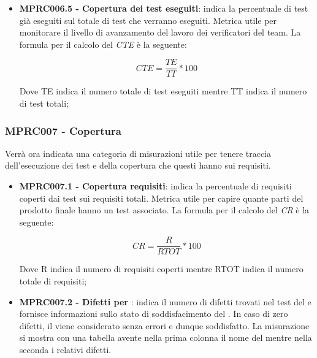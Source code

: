 {\begin{itemize}
    \begin{center}
        \begin{displaymath}
            CD = \frac{DT}{DTU} * 100
        \end{displaymath}
    \end{center}
    Dove DT indica il numero totale di difetti trovati nella fase di test mentre DTU indica la somma dei difetti trovati nei test e quelli trovati durante l'uso del ;
    \item \textbf{MPRC006.5 - Copertura dei test eseguiti}: indica la percentuale di test già eseguiti sul totale di test che verranno eseguiti. Metrica utile per monitorare il livello di avanzamento del lavoro dei verificatori del team. La formula per il calcolo del \textit{CTE} è la seguente:
    \begin{center}
        \begin{displaymath}
            CTE = \frac{TE}{TT} * 100
        \end{displaymath}
    \end{center}
    Dove TE indica il numero totale di test eseguiti mentre TT indica il numero di test totali;
\end{itemize}
\subsubsection{MPRC007 - Copertura}
Verrà ora indicata una categoria di misurazioni utile per tenere traccia dell'esecuzione dei test e della copertura che questi hanno sui requisiti.

\begin{itemize}
    \item \textbf{MPRC007.1 - Copertura requisiti}: indica la percentuale di requisiti coperti dai test sui requisiti totali. Metrica utile per capire quante parti del prodotto finale hanno un test associato. La formula per il calcolo del \textit{CR} è la seguente:
    \begin{center}
        \begin{displaymath}
            CR = \frac{R}{RTOT} * 100
        \end{displaymath}
    \end{center}
    Dove R indica il numero di requisiti coperti mentre RTOT indica il numero totale di requisiti;
    \item \textbf{MPRC007.2 - Difetti per }: indica il numero di difetti trovati nel test del  e fornisce informazioni sullo stato di soddisfacimento del . In caso di zero difetti, il  viene considerato senza errori e dunque soddisfatto. La misurazione si mostra con una tabella avente nella prima colonna il nome del  mentre nella seconda i relativi difetti.
\end{itemize}

}
